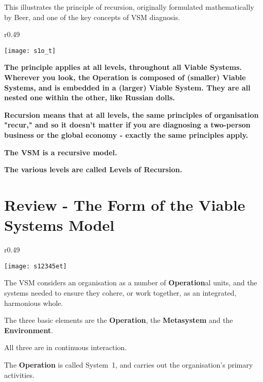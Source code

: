 This illustrates the principle of recursion, originally formulated mathematically by Beer, and one of the key concepts of VSM diagnosis.

\vspace{\baselineskip}

\begin{wrapfigure}[18]{r}{0.49\textwidth}
    \begin{center}
        \texttt{[image: s1o\_t]}
    \end{center}
\end{wrapfigure}

\textbf{The principle applies at all levels, throughout all Viable Systems. Wherever you look, the}
\textcolor{O}{\textbf{Operation}}
\textbf{is composed of (smaller) Viable Systems, and is embedded in a (larger) Viable System. They are all nested one within the other, like Russian dolls.}

\textbf{Recursion means that at all levels, the same principles of organisation "recur," and so it doesn't matter if you are diagnosing a two-person business or the global economy - exactly the same principles apply.}

\textbf{The VSM is a recursive model.}

\textbf{The various levels are called Levels of Recursion.}

\section*{Review - The Form of the Viable Systems Model}

\begin{wrapfigure}[15]{r}{0.49\textwidth}
    \begin{center}
        \texttt{[image: s12345et]}
    \end{center}
\end{wrapfigure}

The VSM considers an organisation as a number of \textcolor{O}{\textbf{Operation}}al units, and the systems needed to ensure they cohere, or work together, as an integrated, harmonious whole.

The three basic elements are the \textcolor{O}{\textbf{Operation}}, the \textcolor{M}{\textbf{Metasystem}} and the \textcolor{E}{\textbf{Environment}}.

All three are in continuous interaction.

The \textcolor{O}{\textbf{Operation}} is called System 1, and carries out the organisation's primary activities.

